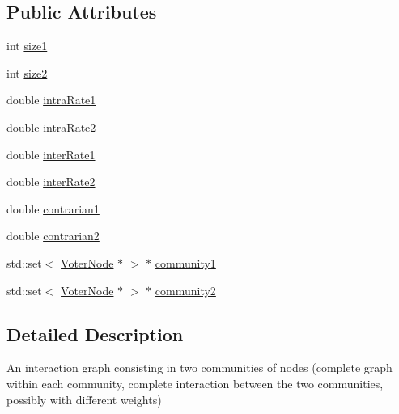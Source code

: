 \subsection*{Public Attributes}
\begin{DoxyCompactItemize}
\item 
int \hyperlink{classTwoCommunitiesVoterGraph_a3c9db0ac7e58d875ab3ce277bf74b284}{size1}
\item 
int \hyperlink{classTwoCommunitiesVoterGraph_a8b88457f020773b984e0d8c85d9ee502}{size2}
\item 
double \hyperlink{classTwoCommunitiesVoterGraph_a96a32ba7529177a7f6b73e827a57791e}{intra\-Rate1}
\item 
double \hyperlink{classTwoCommunitiesVoterGraph_a6e7ea06e014d75b7bf18441885e07e1e}{intra\-Rate2}
\item 
double \hyperlink{classTwoCommunitiesVoterGraph_af08c3b9a6e6f1dc8659a38ecd2d1afde}{inter\-Rate1}
\item 
double \hyperlink{classTwoCommunitiesVoterGraph_afab8bb5994f7fd1370d7d81caf7277d4}{inter\-Rate2}
\item 
double \hyperlink{classTwoCommunitiesVoterGraph_a883bf57bf07fb2e59f05df65df859a46}{contrarian1}
\item 
double \hyperlink{classTwoCommunitiesVoterGraph_a4274a05f5e2ceae57de1f0e71493b9a4}{contrarian2}
\item 
std\-::set$<$ \hyperlink{classVoterNode}{Voter\-Node} $\ast$ $>$ $\ast$ \hyperlink{classTwoCommunitiesVoterGraph_a354768f44c0a3daa6d0a70a20df77af5}{community1}
\item 
std\-::set$<$ \hyperlink{classVoterNode}{Voter\-Node} $\ast$ $>$ $\ast$ \hyperlink{classTwoCommunitiesVoterGraph_a7c918c6733474caa86bc2d217bd2cb4d}{community2}
\end{DoxyCompactItemize}


\subsection{Detailed Description}
An interaction graph consisting in two communities of nodes (complete graph within each community, complete interaction between the two communities, possibly with different weights) 

